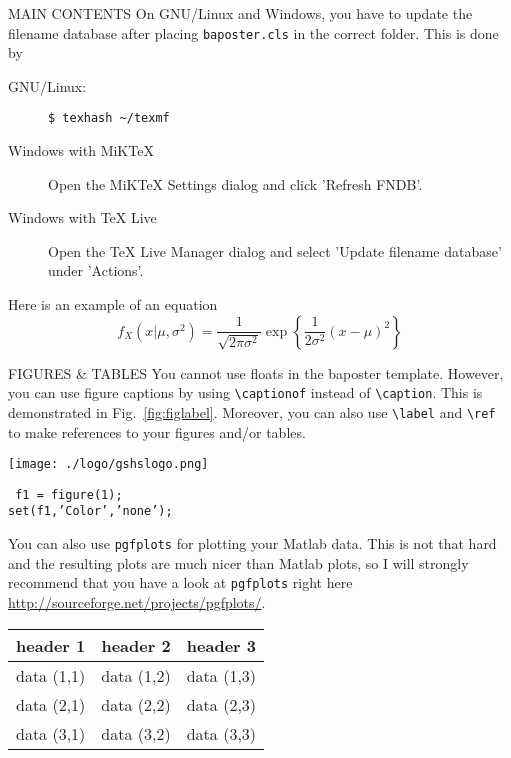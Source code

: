 \documentclass[a0paper,portrait]{baposter}
\begin{document}
\begin{poster}
\begin{posterbox}[name=equation,column=1,below=intro]{MAIN CONTENTS}
  On GNU/Linux and Windows, you have to update the filename database after placing {\tt baposter.cls} in the correct folder. This is done by
  \begin{description}
    \item[GNU/Linux:] {\tt \$ texhash \textasciitilde /texmf}
    \item[Windows with MiKTeX] Open the MiKTeX Settings dialog and click 'Refresh FNDB'.
    \item[Windows with TeX Live] Open the TeX Live Manager dialog and select 'Update filename database' under 'Actions'.
  \end{description}
Here is an example of an equation
\begin{equation}
  f_X(x|\mu,\sigma^2) = \frac{1}{\sqrt{2\pi\sigma^2}}\exp\left\{\frac{1}{2\sigma^2}(x-\mu)^2\right\}
\end{equation}
\end{posterbox}


\begin{posterbox}[name=figures,column=1,below=equation]{FIGURES \& TABLES}
You cannot use floats in the baposter template. However, you can use figure captions by using {\tt \textbackslash captionof} instead of {\tt \textbackslash caption}. This is demonstrated in Fig.~\ref{fig:figlabel}. Moreover, you can also use {\tt \textbackslash label} and {\tt \textbackslash ref} to make references to your figures and/or tables.
\begin{center}
  \texttt{[image: ./logo/gshslogo.png]}
  \label{fig:figlabel}
\end{center}

{\tt
f1 = figure(1);\\
set(f1,'Color','none');
}\par
You can also use {\tt pgfplots} \cite{pgfplots} for plotting your Matlab data. This is not that hard and the resulting plots are much nicer than Matlab plots, so I will strongly recommend that you have a look at {\tt pgfplots} right here \url{http://sourceforge.net/projects/pgfplots/}.
\begin{center}
  \begin{tabular}{c c c}
    \toprule
    header 1 & header 2 & header 3\\
    \midrule
    data (1,1) & data (1,2) & data (1,3)\\
    data (2,1) & data (2,2) & data (2,3)\\
    data (3,1) & data (3,2) & data (3,3)\\
    \bottomrule
  \end{tabular}
  \label{tab:tablabel}
\end{center}
\end{posterbox}



\end{poster}
\end{document}

